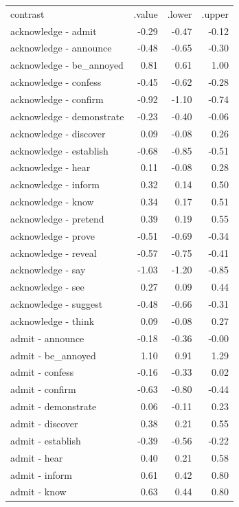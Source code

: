 \begin{longtable}{lrrr}
 contrast & .value & .lower & .upper \\ 
 acknowledge - admit & -0.29 & -0.47 & -0.12 \\ 
  acknowledge - announce & -0.48 & -0.65 & -0.30 \\ 
  acknowledge - be_annoyed & 0.81 & 0.61 & 1.00 \\ 
  acknowledge - confess & -0.45 & -0.62 & -0.28 \\ 
  acknowledge - confirm & -0.92 & -1.10 & -0.74 \\ 
  acknowledge - demonstrate & -0.23 & -0.40 & -0.06 \\ 
  acknowledge - discover & 0.09 & -0.08 & 0.26 \\ 
  acknowledge - establish & -0.68 & -0.85 & -0.51 \\ 
  acknowledge - hear & 0.11 & -0.08 & 0.28 \\ 
  acknowledge - inform & 0.32 & 0.14 & 0.50 \\ 
  acknowledge - know & 0.34 & 0.17 & 0.51 \\ 
  acknowledge - pretend & 0.39 & 0.19 & 0.55 \\ 
  acknowledge - prove & -0.51 & -0.69 & -0.34 \\ 
  acknowledge - reveal & -0.57 & -0.75 & -0.41 \\ 
  acknowledge - say & -1.03 & -1.20 & -0.85 \\ 
  acknowledge - see & 0.27 & 0.09 & 0.44 \\ 
  acknowledge - suggest & -0.48 & -0.66 & -0.31 \\ 
  acknowledge - think & 0.09 & -0.08 & 0.27 \\ 
  admit - announce & -0.18 & -0.36 & -0.00 \\ 
  admit - be_annoyed & 1.10 & 0.91 & 1.29 \\ 
  admit - confess & -0.16 & -0.33 & 0.02 \\ 
  admit - confirm & -0.63 & -0.80 & -0.44 \\ 
  admit - demonstrate & 0.06 & -0.11 & 0.23 \\ 
  admit - discover & 0.38 & 0.21 & 0.55 \\ 
  admit - establish & -0.39 & -0.56 & -0.22 \\ 
  admit - hear & 0.40 & 0.21 & 0.58 \\ 
  admit - inform & 0.61 & 0.42 & 0.80 \\ 
  admit - know & 0.63 & 0.44 & 0.80 \\ 

\end{longtable}
